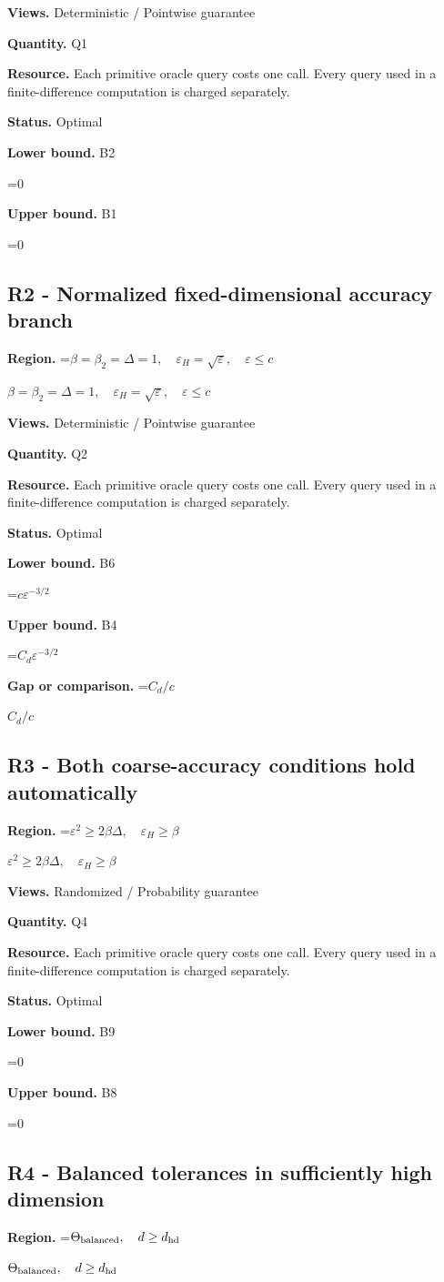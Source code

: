 \documentclass[10pt,a4paper]{article}
\newcommand{\AtlasMath}[1]{\par\begingroup\centering\setbox0=\hbox{$\displaystyle #1$}\ifdim\wd0>1.4\linewidth\typeout{ATLAS WIDE FORMULA: \the\wd0}\fi\ifdim\wd0>\linewidth\resizebox{\linewidth}{!}{\box0}\else\box0\fi\par\endgroup}
\newcommand{\AtlasInlineMath}[1]{\begingroup\setbox0=\hbox{$#1$}\ifdim\wd0>.4\linewidth\endgroup\AtlasMath{#1}\else\endgroup$#1$\fi}
\begin{document}
\textbf{Views.} Deterministic / Pointwise guarantee

\textbf{Quantity.} Q1

\textbf{Resource.} Each primitive oracle query costs one call. Every query used in a finite-difference computation is charged separately.

\textbf{Status.} Optimal

\textbf{Lower bound.} B2

\AtlasMath{0}
\textbf{Upper bound.} B1

\AtlasMath{0}
\subsection{R2 - Normalized fixed-dimensional accuracy branch}
\textbf{Region.} \AtlasInlineMath{\beta=\beta_2=\Delta=1,\quad\varepsilon_H=\sqrt\varepsilon,\quad\varepsilon\le c}

\textbf{Views.} Deterministic / Pointwise guarantee

\textbf{Quantity.} Q2

\textbf{Resource.} Each primitive oracle query costs one call. Every query used in a finite-difference computation is charged separately.

\textbf{Status.} Optimal

\textbf{Lower bound.} B6

\AtlasMath{c\varepsilon^{-3/2}}
\textbf{Upper bound.} B4

\AtlasMath{C_d\varepsilon^{-3/2}}
\textbf{Gap or comparison.} \AtlasInlineMath{C_d/c}

\subsection{R3 - Both coarse-accuracy conditions hold automatically}
\textbf{Region.} \AtlasInlineMath{\varepsilon^2\ge2\beta\Delta,\quad\varepsilon_H\ge\beta}

\textbf{Views.} Randomized / Probability guarantee

\textbf{Quantity.} Q4

\textbf{Resource.} Each primitive oracle query costs one call. Every query used in a finite-difference computation is charged separately.

\textbf{Status.} Optimal

\textbf{Lower bound.} B9

\AtlasMath{0}
\textbf{Upper bound.} B8

\AtlasMath{0}
\subsection{R4 - Balanced tolerances in sufficiently high dimension}
\textbf{Region.} \AtlasInlineMath{\Theta_{\rm balanced},\quad d\ge d_{\rm hd}}
\end{document}

